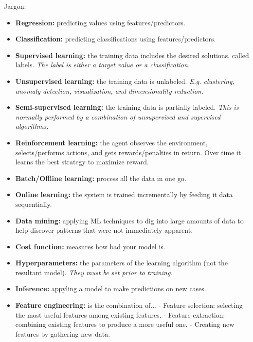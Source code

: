 \vspace{-4.0mm}
Jargon:
\begin{itemize}
\vspace{-4.0mm}
\item
\textbf{Regression:} predicting values using features/predictors.
\item
\textbf{Classification:} predicting classifications using features/predictors.
\item
\textbf{Supervised learning:}
the training data includes the desired solutions, called labels.\newline
\textit{The label is either a target value or a classification.}
\item
\textbf{Unsupervised learning:}
the training data is unlabeled.\newline
\textit{E.g. clustering, anomaly detection, visualization, and dimensionality reduction.}
\item
\textbf{Semi-supervised learning:}
the training data is partially labeled.\newline
\textit{This is normally performed by a combination of unsupervised and supervised algorithms.}
\item
\textbf{Reinforcement learning:}
the agent observes the environment, selects/performs actions, and gets rewards/penalties in return.
Over time it learns the best strategy to maximize reward.
\item
\textbf{Batch/Offline learning:}
process all the data in one go.
\item
\textbf{Online learning:}
the system is trained incrementally by feeding it data sequentially.
\item
\textbf{Data mining:}
applying ML techniques to dig into large amounts of data
to help discover patterns that were not immediately apparent.
\item
\textbf{Cost function:}
measures how bad your model is.
\item
\textbf{Hyperparameters:}
the parameters of the learning algorithm (not the resultant model).\newline
\textit{They must be set prior to training.}
\item
\textbf{Inference:}
appyling a model to make predictions on new cases.
\item
\textbf{Feature engineering:}
is the combination of...\newline
- Feature selection: selecting the most useful features among existing features.\newline
- Feature extraction: combining existing features to produce a more useful one.\newline
- Creating new features by gathering new data.
\end{itemize}

